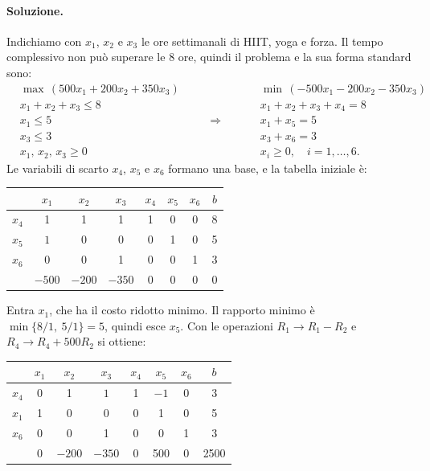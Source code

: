 \paragraph{Soluzione.}
Indichiamo con $x_1$, $x_2$ e $x_3$ le ore settimanali di HIIT, yoga e forza. Il tempo complessivo non può superare le $8$ ore, quindi il problema e la sua forma standard sono:
\[
\begin{aligned}
&\max\, (500x_1 + 200x_2 + 350x_3) \\
&x_1 + x_2 + x_3 \le 8 \\
&x_1 \le 5 \\
&x_3 \le 3 \\
&x_1,\, x_2,\, x_3 \ge 0
\end{aligned}
\qquad\Longrightarrow\qquad
\begin{aligned}
&\min\, (-500x_1 - 200x_2 - 350x_3) \\
&x_1 + x_2 + x_3 + x_4 = 8 \\
&x_1 + x_5 = 5 \\
&x_3 + x_6 = 3 \\
&x_i \ge 0, \quad i = 1, \dots, 6.
\end{aligned}
\]
Le variabili di scarto $x_4$, $x_5$ e $x_6$ formano una base, e la tabella iniziale è:
\begin{center}
\begin{tabular}{c|cccccc|c}
 & $x_1$ & $x_2$ & $x_3$ & $x_4$ & $x_5$ & $x_6$ & $b$ \\
\hline
$x_4$ & 1 & 1 & 1 & 1 & 0 & 0 & 8 \\
$x_5$ & $\boxed{1}$ & 0 & 0 & 0 & 1 & 0 & 5 \\
$x_6$ & 0 & 0 & 1 & 0 & 0 & 1 & 3 \\
\hline
 & $-500$ & $-200$ & $-350$ & 0 & 0 & 0 & 0 \\
\end{tabular}
\end{center}
Entra $x_1$, che ha il costo ridotto minimo. Il rapporto minimo è $\min\{8/1,\ 5/1\} = 5$, quindi esce $x_5$. Con le operazioni $R_1 \to R_1 - R_2$ e $R_4 \to R_4 + 500R_2$ si ottiene:
\begin{center}
\begin{tabular}{c|cccccc|c}
 & $x_1$ & $x_2$ & $x_3$ & $x_4$ & $x_5$ & $x_6$ & $b$ \\
\hline
$x_4$ & 0 & 1 & $\boxed{1}$ & 1 & $-1$ & 0 & 3 \\
$x_1$ & 1 & 0 & 0 & 0 & 1 & 0 & 5 \\
$x_6$ & 0 & 0 & 1 & 0 & 0 & 1 & 3 \\
\hline
 & 0 & $-200$ & $-350$ & 0 & 500 & 0 & 2500 \\
\end{tabular}
\end{center}
